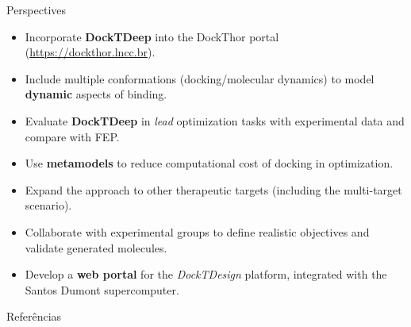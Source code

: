 \documentclass[aspectratio=169,xcolor=dvipsnames]{beamer}
\begin{document}
\begin{frame}{Perspectives}

    \begin{itemize}
        \item Incorporate \textbf{DockTDeep} into the DockThor portal (\url{https://dockthor.lncc.br}).

        \item Include multiple conformations (docking/molecular dynamics) to model \textbf{dynamic} aspects of binding.

        \item Evaluate \textbf{DockTDeep} in \textit{lead} optimization tasks with experimental data and compare with FEP.

        \item Use \textbf{metamodels} to reduce computational cost of docking in optimization.

        \item Expand the approach to other therapeutic targets (including the multi-target scenario).

        \item Collaborate with experimental groups to define realistic objectives and validate generated molecules.

        \item Develop a \textbf{web portal} for the \textit{DockTDesign} platform, integrated with the Santos Dumont supercomputer.
    \end{itemize}

\end{frame}


\begin{frame}[allowframebreaks]{Referências}
    \footnotesize
    \nocite{*} %
    
    
\end{frame}

\end{document}
